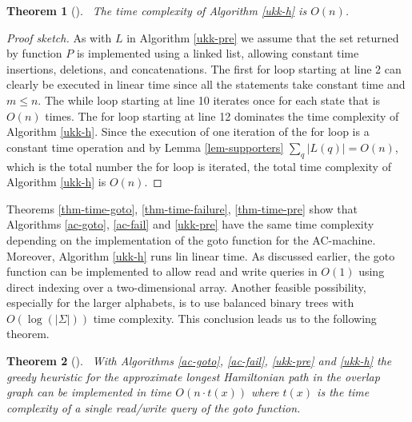 \documentclass[english,twoside,censored,csm,algorithms-track-2020]{HYthesisML}
\theoremstyle{plain}
\newtheorem{theorem}{Theorem}[chapter]
\theoremstyle{definition}
\begin{document}
\begin{theorem}[]~\label{thm-time-h}
  The time complexity of Algorithm \ref{ukk-h} is $O(n)$.
\end{theorem}
\begin{proof}[Proof sketch]

As with $L$ in Algorithm \ref{ukk-pre}
we assume that the set returned by function $P$ is implemented using a linked list, allowing constant
time insertions, deletions, and concatenations. The first for loop starting at line 2 can clearly be
executed in linear time since all the statements take constant time and $m \leq n $. The while loop
starting at line 10 iterates once for each state that is $O(n)$ times. The for loop starting
at line 12 dominates the time complexity of Algorithm \ref{ukk-h}. Since the execution of one iteration
of the for loop is a constant time operation and by Lemma \ref{lem-supporters} $\sum_q |L(q)| = O(n)$,
which is the total number the for loop is iterated, the total time complexity of Algorithm \ref{ukk-h}
is $O(n)$.

\end{proof}

Theorems \ref{thm-time-goto}, \ref{thm-time-failure}, \ref{thm-time-pre}
show that Algorithms \ref{ac-goto}, \ref{ac-fail} and \ref{ukk-pre} have the same time complexity depending
on the implementation of the goto function for the AC-machine. Moreover, Algorithm \ref{ukk-h} runs lin
linear time. As discussed earlier, the goto function
can be implemented to allow read and write queries in  $O(1)$ using direct indexing over a
two-dimensional array. Another feasible possibility, especially for the larger alphabets,
is to use balanced
binary trees with $O(\log(|\Sigma|))$ time complexity. This conclusion leads us to the following theorem.

\begin{theorem}[]~\label{thm-overall-time}
  With Algorithms \ref{ac-goto}, \ref{ac-fail}, \ref{ukk-pre} and \ref{ukk-h} the greedy heuristic
  for the approximate longest Hamiltonian path in the overlap graph can be implemented in time
  $O(n \cdot t(x))$ where $t(x)$ is the time complexity of a single read/write query of the
  goto function.
\end{theorem}



\end{document}
